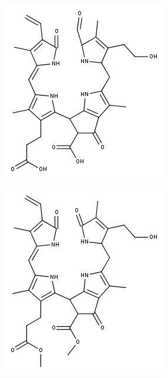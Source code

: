 \begin{figure}[!htbp]
  \begin{subfigure}[b]{0.5\textwidth}
    \includegraphics[width=\textwidth]{figures/Kapitel7/Kataboliten/fragmentation_structures/VWA_Katabolit_631.png}
    \caption{}
    \label{fig:NCC2725}
  \end{subfigure}
  \hfill
  \begin{subfigure}[b]{0.5\textwidth}
    \includegraphics[width=\textwidth]{figures/Kapitel7/Kataboliten/fragmentation_structures/VWA_Katabolit_645_nachReaktion.png}

\end{subfigure}
\end{figure}
